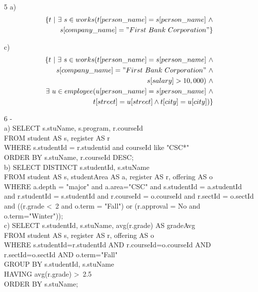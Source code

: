 \documentclass{article}
\begin{document}
5 a)
	\begin{equation}
	\begin{split}
		\{t\ |\ \exists\ s \in works(t[person\_name] = s[person\_name]\ \wedge \\
		 s[company\_name] = "First\ Bank\ Corporation"\}
	\end{split}
	\end{equation}

	c)
	\begin{equation}
	\begin{split}
		\{t\ |\ \exists\ s \in works(t[person\_name] = s[person\_name]\ \wedge \\
		 s[company\_name] = "First\ Bank\ Corporation"\ \wedge \\
		 s[salary] > 10,000)\ \wedge \\
		  \exists\ u \in employee(u[person\_name] = s[person\_name]\ \wedge \\
		   t[street] = u[street] \wedge t[city] = u[city])\}
	\end{split}
	\end{equation}

6 - \\
a)
SELECT s.stuName, s.program, r.courseId \\
FROM student AS s, register AS r \\
WHERE s.studentId = r.studentid and courseId like "CSC*" \\
ORDER BY s.stuName, r.courseId DESC; \\

b)
SELECT DISTINCT s.studentId, s.stuName \\
FROM student AS s, studentArea AS a, register AS r, offering AS o \\
WHERE a.depth = "major" and a.area="CSC" and s.studentId = a.studentId and r.studentId = s.studentId and r.courseId = o.courseId and r.sectId = o.sectId and ((r.grade \textless\ 2 and o.term = "Fall") or (r.approval = No and o.term="Winter")); \\

c)
SELECT s.studentId, s.stuName, avg(r.grade) AS gradeAvg \\
FROM student AS s, register AS r, offering AS o \\
WHERE s.studentId=r.studentId AND r.courseId=o.courseId AND r.sectId=o.sectId AND o.term="Fall" \\
GROUP BY s.studentId, s.stuName \\
HAVING avg(r.grade) \textgreater \ 2.5 \\
ORDER BY s.stuName; \\
\end{document}
